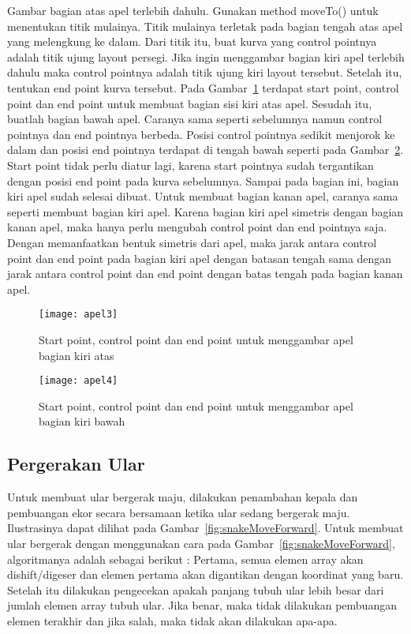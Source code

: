 Gambar bagian atas apel terlebih dahulu. Gunakan method moveTo() untuk menentukan titik mulainya. Titik mulainya terletak pada bagian tengah atas apel yang melengkung ke dalam. Dari titik itu, buat kurva yang control pointnya adalah titik ujung layout persegi. Jika ingin menggambar bagian kiri apel terlebih dahulu maka control pointnya adalah titik ujung kiri layout tersebut. Setelah itu, tentukan end point kurva tersebut. Pada Gambar~\ref{fig:apel3} terdapat start point, control point dan end point untuk membuat bagian sisi kiri atas apel. Sesudah itu, buatlah bagian bawah apel. Caranya sama seperti sebelumnya namun control pointnya dan end pointnya berbeda. Posisi control pointnya sedikit menjorok ke dalam dan posisi end pointnya terdapat di tengah bawah seperti pada Gambar~\ref{fig:apel4}. Start point tidak perlu diatur lagi, karena start pointnya sudah tergantikan dengan posisi end point pada kurva sebelumnya. Sampai pada bagian ini, bagian kiri apel sudah selesai dibuat. Untuk membuat bagian kanan apel, caranya sama seperti membuat bagian kiri apel. Karena bagian kiri apel simetris dengan bagian kanan apel, maka hanya perlu mengubah control point dan end pointnya saja. Dengan memanfaatkan bentuk simetris dari apel, maka jarak antara control point dan end point pada bagian kiri apel dengan batasan tengah sama dengan jarak antara control point dan end point dengan batas tengah pada bagian kanan apel. 

\begin{figure}[H]
	\centering  
	\texttt{[image: apel3]}  
	\caption[Start point, control point dan end point untuk menggambar apel bagian kiri atas]{Start point, control point dan end point untuk menggambar apel bagian kiri atas}
	\label{fig:apel3} 
\end{figure}

\begin{figure}[H]
	\centering  
	\texttt{[image: apel4]}  
	\caption[Start point, control point dan end point untuk menggambar apel bagian kiri bawah]{Start point, control point dan end point untuk menggambar apel bagian kiri bawah}
	\label{fig:apel4} 
\end{figure}

\subsection{Pergerakan Ular}
Untuk membuat ular bergerak maju, dilakukan penambahan kepala dan pembuangan ekor secara bersamaan ketika ular sedang bergerak maju. Ilustrasinya dapat dilihat pada Gambar~\ref{fig:snakeMoveForward}. Untuk membuat ular bergerak dengan menggunakan cara pada Gambar~\ref{fig:snakeMoveForward}, algoritmanya adalah sebagai berikut : Pertama, semua elemen array akan dishift/digeser dan elemen pertama akan digantikan dengan koordinat yang baru. Setelah itu dilakukan pengecekan apakah panjang tubuh ular lebih besar dari jumlah elemen array tubuh ular. Jika benar, maka tidak dilakukan pembuangan elemen terakhir dan jika salah, maka tidak akan dilakukan apa-apa. 


